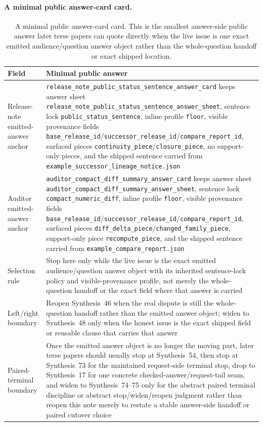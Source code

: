 \documentclass[11pt]{article}
\begin{document}
\paragraph{A minimal public answer-card card.}
\begin{table}[t]
\centering
\small
\begin{tabularx}{\linewidth}{@{}lX@{}}
\toprule
Field & Minimal public answer \\
\midrule
Release-note emitted-answer anchor & \nolinkurl{release_note_public_status_sentence_answer_card} keeps answer sheet \nolinkurl{release_note_public_status_sentence_answer_sheet}, sentence lock \nolinkurl{public_status_sentence}, inline profile \nolinkurl{floor}, visible provenance fields \nolinkurl{base_release_id}/\nolinkurl{successor_release_id}/\nolinkurl{compare_report_id}, surfaced pieces \nolinkurl{continuity_piece}/\nolinkurl{closure_piece}, no support-only pieces, and the shipped sentence carried from \nolinkurl{example_successor_lineage_notice.json} \\
Auditor emitted-answer anchor & \nolinkurl{auditor_compact_diff_summary_answer_card} keeps answer sheet \nolinkurl{auditor_compact_diff_summary_answer_sheet}, sentence lock \nolinkurl{compact_numeric_diff}, inline profile \nolinkurl{floor}, visible provenance fields \nolinkurl{base_release_id}/\nolinkurl{successor_release_id}/\nolinkurl{compare_report_id}, surfaced pieces \nolinkurl{diff_delta_piece}/\nolinkurl{changed_family_piece}, support-only piece \nolinkurl{recompute_piece}, and the shipped sentence carried from \nolinkurl{example_compare_report.json} \\
Selection rule & Stop here only while the live issue is the exact emitted audience/question answer object with its inherited sentence-lock policy and visible-provenance profile, not merely the whole-question handoff or the exact field where that answer is carried \\
Left/right boundary & Reopen Synthesis~46 when the real dispute is still the whole-question handoff rather than the emitted answer object; widen to Synthesis~48 only when the honest issue is the exact shipped field or reusable clause that carries that answer \\
Paired-terminal boundary & Once the emitted answer object is no longer the moving part, later terse papers should usually stop at Synthesis~54, then stop at Synthesis~73 for the maintained request-side terminal stop, drop to Synthesis~17 for one concrete checked-answer/request-tail seam, and widen to Synthesis~74--75 only for the abstract paired terminal discipline or abstract stop/widen/reopen judgment rather than reopen this note merely to restate a stable answer-side handoff or paired cutover choice \\
\bottomrule
\end{tabularx}
\caption{A minimal public answer-card card. This is the smallest answer-side public answer later terse papers can quote directly when the live issue is one exact emitted audience/question answer object rather than the whole-question handoff or exact shipped location.}
\label{tab:minimal-public-answer-card-card}
\end{table}
\end{document}
